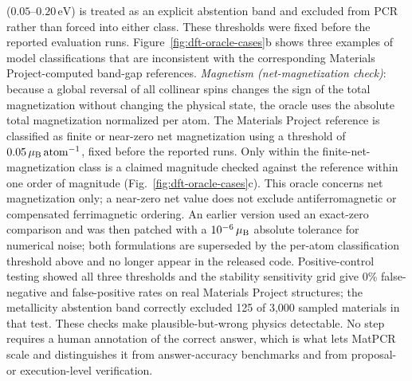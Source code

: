 \documentclass[pdflatex,sn-nature]{sn-jnl}
\begin{document}
($0.05$--$0.20\,\mathrm{eV}$) is treated as an explicit abstention band
and excluded from PCR rather than forced into either class. These thresholds
were fixed before the reported evaluation runs. Figure~\ref{fig:dft-oracle-cases}b
shows three examples of model classifications that are inconsistent with the
corresponding Materials Project-computed band-gap references.
\emph{Magnetism (net-magnetization check)}: because a global reversal of all
collinear spins changes the sign of the total magnetization without changing the
physical state, the oracle uses the absolute total magnetization normalized per
atom. The Materials Project reference is classified as finite or near-zero net
magnetization using a threshold of
$0.05\,\mu_{\rm B}\,\mathrm{atom}^{-1}$, fixed before the reported runs.
Only within the finite-net-magnetization class is a claimed magnitude checked
against the reference within one order of magnitude
(Fig.~\ref{fig:dft-oracle-cases}c). This oracle concerns net magnetization only;
a near-zero net value does not exclude antiferromagnetic or compensated
ferrimagnetic ordering. An earlier version used an exact-zero comparison and was
then patched with a $10^{-6}\,\mu_{\rm B}$ absolute tolerance for numerical noise;
both formulations are superseded by the per-atom classification threshold above
and no longer appear in the released code.
Positive-control testing showed all
three thresholds and the stability sensitivity grid give 0\% false-negative and
false-positive rates on real Materials Project structures; the metallicity abstention band
correctly excluded 125 of 3{,}000 sampled materials in that test. These checks make plausible-but-wrong physics detectable.
No step requires a human annotation of the correct answer, which is what lets MatPCR
scale and distinguishes it from answer-accuracy benchmarks and from proposal- or
execution-level verification.
\end{document}
